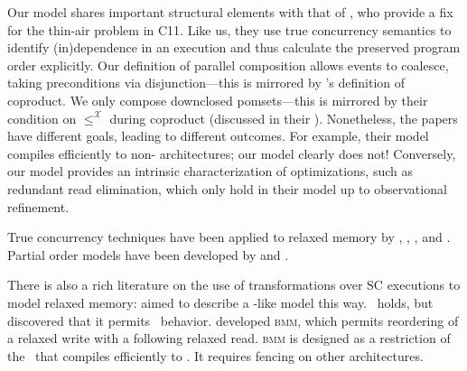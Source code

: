 Our model shares important structural elements with that of
\citet{DBLP:conf/esop/PaviottiCPWOB20}, who provide a fix for the thin-air
problem in C11.  Like us, they use true concurrency semantics to identify
(in)dependence in an execution and thus calculate the preserved program order
explicitly.  Our definition of parallel composition allows events to
coalesce, taking preconditions via disjunction---this is mirrored by
\citeauthor{DBLP:conf/esop/PaviottiCPWOB20}'s definition of coproduct.  We
only compose downclosed pomsets---this is mirrored by their condition on
$\leq^{\mathcal{X}}$ during coproduct (discussed in their ).
Nonetheless, the papers have different goals, leading to different outcomes.
For example, their model compiles efficiently to non-\mca{} architectures; our
model clearly does not!  Conversely, our model provides an intrinsic
characterization of optimizations, such as redundant read elimination, which
only hold in their model up to observational refinement.




True concurrency techniques have been applied to relaxed memory by
\citet{DBLP:conf/esop/CenciarelliKS07}, \citet{Castellan},
\citet{Pichon-Pharabod:2016:CSR:2837614.2837616}, and
\citet{DBLP:conf/cgo/ChakrabortyV17}.
Partial order models have been developed by \citet{brookes} and
\citet{DBLP:journals/lmcs/KavanaghB19}.

There is also a rich literature on the use of transformations over SC
executions to model relaxed memory:
%
\citet{Saraswat:2007:TMM:1229428.1229469}
aimed to describe a \jmm-like model this way.  \drfsc\ holds, but \citet{SP} 
discovered that it permits \oota\ behavior.
%
\citet{DBLP:conf/popl/DemangeLZJPV13} developed \textsc{bmm}, which permits
reordering of a relaxed write with a following relaxed read.
\textsc{bmm} is designed as a restriction of the \jmm\ that compiles efficiently to
\tso.  It requires fencing on other architectures.

